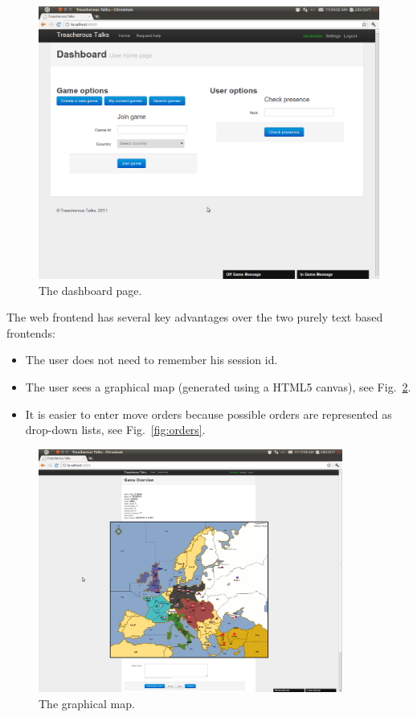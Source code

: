 \documentclass[11pt,a4paper]{report}
\begin{document}
\begin{figure}[h]
 \centering
 \includegraphics[width=\textwidth]{./graphics/overviewpage.png}
 \caption{The dashboard page.}
 \label{fig:dashboard}
\end{figure}

The web frontend has several key advantages over the two purely text based
frontends:
\begin{itemize}
\item The user does not need to remember his session id.
\item The user sees a graphical map (generated using a HTML5 canvas),
  see Fig.~\ref{fig:map}.
\item It is easier to enter move orders because possible orders are represented
  as drop-down lists, see Fig.~\ref{fig:orders}.
\end{itemize}

\begin{figure}[h]
 \centering
 \includegraphics[width=10cm]{./graphics/graphicalmap.png}
 \caption{The graphical map.}
 \label{fig:map}
\end{figure}
\end{document}
